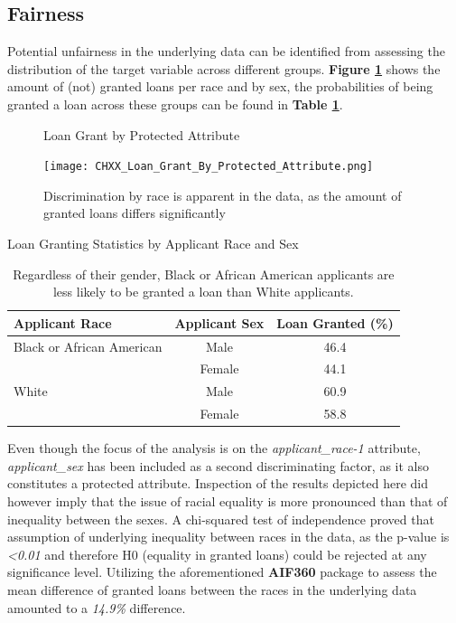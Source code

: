 \subsection{Fairness}\label{subsec:Fairness}


Potential unfairness in the underlying data can be identified from assessing the distribution of the target variable across different groups.
\textbf{Figure \ref{fig:CHXX_Loan_Grant_By_Protected_Attribute}} shows the amount of (not) granted loans per race and by sex, the probabilities of being granted a loan across these groups can be found in \textbf{Table \ref{tab:loan_granting}}.\@

\begin{figure}[h]
    \centering
    \caption{Loan Grant by Protected Attribute}
    \texttt{[image: CHXX\_Loan\_Grant\_By\_Protected\_Attribute.png]}
    \caption*{Discrimination by race is apparent in the data, as the amount of granted loans differs significantly}
    \label{fig:CHXX_Loan_Grant_By_Protected_Attribute}
\end{figure}

\begin{table}[htbp]
    \centering
      \caption{Loan Granting Statistics by Applicant Race and Sex}
      \begin{tabular}{lcc}
      \toprule
      \textbf{Applicant Race} & \textbf{Applicant Sex} & \textbf{Loan Granted (\%)} \\
      \midrule
      Black or African American & Male    & 46.4 \\
            & Female  & 44.1 \\
      White & Male    & 60.9 \\
            & Female  & 58.8 \\
      \bottomrule
      \end{tabular}
      \caption*{Regardless of their gender, Black or African American applicants are less likely to be granted a loan than White applicants.}
    \label{tab:loan_granting}%
\end{table}%

Even though the focus of the analysis is on the \textit{applicant\_race-1} attribute, \textit{applicant\_sex} has been included as a second discriminating factor, as it also constitutes a protected attribute.
Inspection of the results depicted here did however imply that the issue of racial equality is more pronounced than that of inequality between the sexes.
A chi-squared test of independence proved that assumption of underlying inequality between races in the data, as the p-value is \textit{<0.01} and therefore H0 (equality in granted loans) could be rejected at any significance level.
Utilizing the aforementioned \textbf{AIF360} package to assess the mean difference of granted loans between the races in the underlying data amounted to a \textit{14.9\%} difference.

